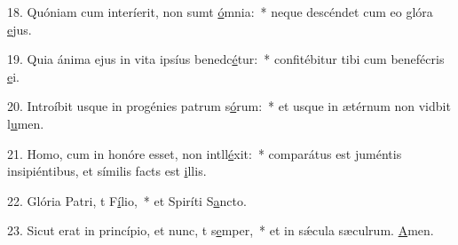 18. Quóniam cum interíerit, non sumt \uline{ó}mnia:~* neque descéndet cum eo glóra \uline{e}jus.\par 
19. Quia ánima ejus in vita ipsíus benedc\uline{é}tur:~* confitébitur tibi cum benefécris \uline{e}i.\par 
20. Introíbit usque in progénies patrum s\uline{ó}rum:~* et usque in ætérnum non vidbit l\uline{u}men.\par 
21. Homo, cum in honóre esset, non intll\uline{é}xit:~* comparátus est juméntis insipiéntibus, et símilis facts est \uline{i}llis.\par 
22. Glória Patri, t F\uline{í}lio,~* et Spiríti S\uline{a}ncto.\par 
23. Sicut erat in princípio, et nunc, t s\uline{e}mper,~* et in sǽcula sæculrum. \uline{A}men.\par 
